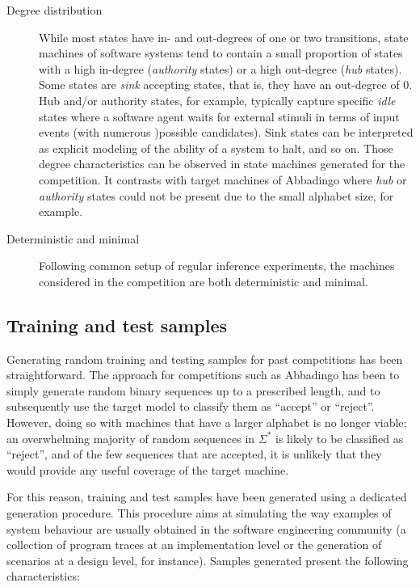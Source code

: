 \begin{description}
\item[Degree distribution] While most states have in- and out-degrees of one or two transitions, state machines of software systems tend to contain a small proportion of states with a high in-degree (\emph{authority} states) or a high out-degree (\emph{hub} states). Some states are \emph{sink} accepting states, that is, they have an out-degree of 0. Hub and/or authority states, for example, typically capture specific \emph{idle} states where a software agent waits for external stimuli in terms of input events (with numerous )possible candidates). Sink states can be interpreted as explicit modeling of the ability of a system to halt, and so on. Those degree characteristics can be observed in state machines generated for the competition. It contrasts with target machines of Abbadingo where \emph{hub} or \emph{authority} states could not be present due to the small alphabet size, for example.

\item[Deterministic and minimal] Following common setup of regular inference experiments, the machines considered in the competition are both deterministic and minimal.

\end{description}

\subsection{Training and test samples}

Generating random training and testing samples for past competitions has been straightforward. The approach for competitions such as Abbadingo has been to simply generate random binary sequences up to a prescribed length, and to subsequently use the target model to classify them as ``accept'' or ``reject''. However, doing so with machines that have a larger alphabet is no longer viable; an overwhelming majority of random sequences in $\Sigma^{*}$ is likely to be classified as ``reject'', and of the few sequences that are accepted, it is unlikely that they would provide any useful coverage of the target machine. 

For this reason, training and test samples have been generated using a dedicated generation procedure. This procedure aims at simulating the way examples of system behaviour are usually obtained in the software engineering community (a collection of program traces at an implementation level or the generation of scenarios at a design level, for instance). Samples generated present the following characteristics:

